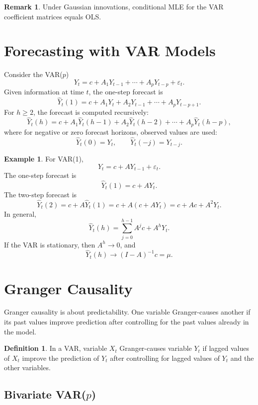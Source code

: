 \documentclass[12pt,oneside]{book}
\numberwithin{equation}{section}
\theoremstyle{definition}
\newtheorem{definition}{Definition}[section]
\newtheorem{example}{Example}[section]
\newtheorem{remark}{Remark}[section]
\theoremstyle{plain}
\theoremstyle{remark}
\begin{document}
\begin{remark}
Under Gaussian innovations, conditional MLE for the VAR coefficient matrices equals OLS.
\end{remark}

\section{Forecasting with VAR Models}

Consider the VAR($p$)
\[
Y_t=c+A_1Y_{t-1}+\cdots+A_pY_{t-p}+\varepsilon_t.
\]
Given information at time $t$, the one-step forecast is
\[
\widehat{Y}_t(1)
=
c+A_1Y_t+A_2Y_{t-1}+\cdots+A_pY_{t-p+1}.
\]
For $h\geq 2$, the forecast is computed recursively:
\[
\widehat{Y}_t(h)
=
c
+
A_1\widehat{Y}_t(h-1)
+
A_2\widehat{Y}_t(h-2)
+\cdots+
A_p\widehat{Y}_t(h-p),
\]
where for negative or zero forecast horizons, observed values are used:
\[
\widehat{Y}_t(0)=Y_t,
\qquad
\widehat{Y}_t(-j)=Y_{t-j}.
\]

\begin{example}
For VAR(1),
\[
Y_t=c+AY_{t-1}+\varepsilon_t.
\]
The one-step forecast is
\[
\widehat{Y}_t(1)=c+AY_t.
\]
The two-step forecast is
\[
\widehat{Y}_t(2)=c+A\widehat{Y}_t(1)
=c+A(c+AY_t)
=c+Ac+A^2Y_t.
\]
In general,
\[
\widehat{Y}_t(h)
=
\sum_{j=0}^{h-1}A^jc+A^hY_t.
\]
If the VAR is stationary, then $A^h\to 0$, and
\[
\widehat{Y}_t(h)\to (I-A)^{-1}c=\mu.
\]
\end{example}

\section{Granger Causality}

Granger causality is about predictability. One variable Granger-causes another if its past values improve prediction after controlling for the past values already in the model.

\begin{definition}
In a VAR, variable $X_t$ Granger-causes variable $Y_t$ if lagged values of $X_t$ improve the prediction of $Y_t$ after controlling for lagged values of $Y_t$ and the other variables.
\end{definition}

\subsection{Bivariate VAR($p$)}
\end{document}
